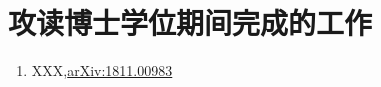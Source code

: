 \chapter*{攻读博士学位期间完成的工作}

\thispagestyle{fancy}


\vspace{0.5cm}

\begin{enumerate}

\item XXX,\href{https://arxiv.org/pdf/1811.00983.pdf}{arXiv:1811.00983}

\end{enumerate}
